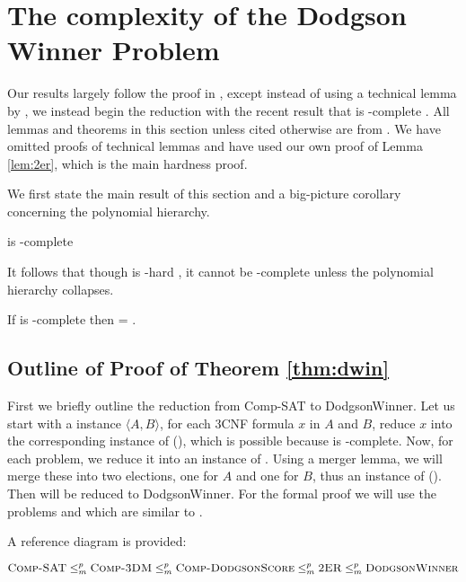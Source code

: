 \section{The complexity of the Dodgson Winner Problem}
Our results largely follow the proof in \citet{exactdodgson}, except instead of
using a technical lemma by \citet{wag90}, we instead begin the reduction
with the recent result that  is \tp-complete \citep{compsat}.
All lemmas and theorems in this section
unless cited otherwise are from \citet{exactdodgson}.
We have omitted proofs of technical lemmas and have used our own proof of Lemma
\ref{lem:2er}, which is the main hardness proof.

We first state the main result of this section and a big-picture corollary
concerning the polynomial hierarchy.

\begin{theorem}\label{thm:dwin}
     is \tp-complete
\end{theorem}

It follows that though  is \np-hard \citep{bartholdiVoting},
it cannot be \np-complete unless the polynomial hierarchy collapses.

\begin{corollary}
    If  is \np-complete then  = \np.
\end{corollary}

\subsection{Outline of Proof of Theorem \ref{thm:dwin}}
    First we briefly outline the reduction from Comp-SAT to
DodgsonWinner.
Let us start with a \csat instance $\langle A,B \rangle$, for each 3CNF
formula $x$ in $A$ and $B$, reduce $x$ into the corresponding instance of
 (), which is possible because
 is \np-complete.
Now, for each  problem, we reduce it into an instance of
\dscore.
Using a merger lemma, we will merge these into two elections, one for $A$
and one for $B$, thus an instance of  ().
Then  will be reduced to DodgsonWinner.
For the formal proof we will use the problems  and
 which are similar to \csat.

A reference diagram is provided:

\[\text{{\sc Comp-SAT}} \le_m^p \text{{\sc Comp-3DM}} \le_m^p
\text{{\sc Comp-DodgsonScore}} \le_m^p
\text{{\sc 2ER}} \le_m^p \text{{\sc DodgsonWinner}}\]

